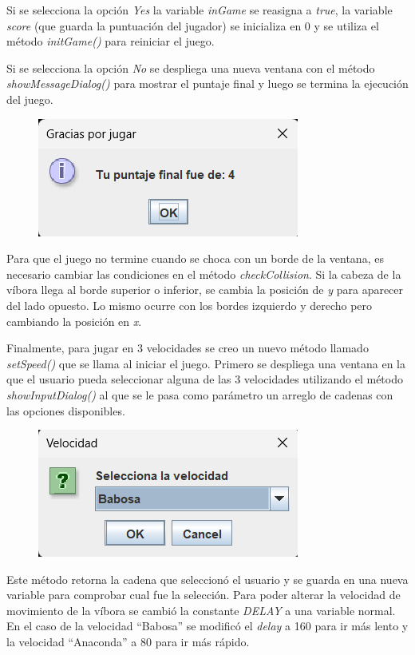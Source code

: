 \documentclass[11pt, twocolumn]{article}
\begin{document}
  Si se selecciona la opción \textit{Yes} la variable \textit{inGame} se reasigna a \textit{true}, la variable \textit{score} (que guarda la puntuación del jugador) se inicializa en 0 y se utiliza el método \textit{initGame()} para reiniciar el juego.

  Si se selecciona la opción \textit{No} se despliega una nueva ventana con el método \textit{showMessageDialog()} para mostrar el puntaje final y luego se termina la ejecución del juego.

  \begin{figure}[ht]
    \includegraphics[width=0.6\columnwidth, center]{v2.png}
  \end{figure}  

  Para que el juego no termine cuando se choca con un borde de la ventana, es necesario cambiar las condiciones en el método \textit{checkCollision}. Si la cabeza de la víbora llega al borde superior o inferior, se cambia la posición de \textit{y} para aparecer del lado opuesto. Lo mismo ocurre con los bordes izquierdo y derecho pero cambiando la posición en \textit{x}.

  Finalmente, para jugar en 3 velocidades se creo un nuevo método llamado \textit{setSpeed()} que se llama al iniciar el juego. Primero se despliega una ventana en la que el usuario pueda seleccionar alguna de las 3 velocidades utilizando el método \textit{showInputDialog()} al que se le pasa como parámetro un arreglo de cadenas con las opciones disponibles.

  \begin{figure}[ht]
    \includegraphics[width=0.6\columnwidth, center]{v3.png}
  \end{figure}
  
  Este método retorna la cadena que seleccionó el usuario y se guarda en una nueva variable para comprobar cual fue la selección. Para poder alterar la velocidad de movimiento de la víbora se cambió la constante \textit{DELAY} a una variable normal. En el caso de la velocidad ``Babosa'' se modificó el \textit{delay} a 160 para ir más lento y la velocidad ``Anaconda'' a 80 para ir más rápido.
\end{document}
